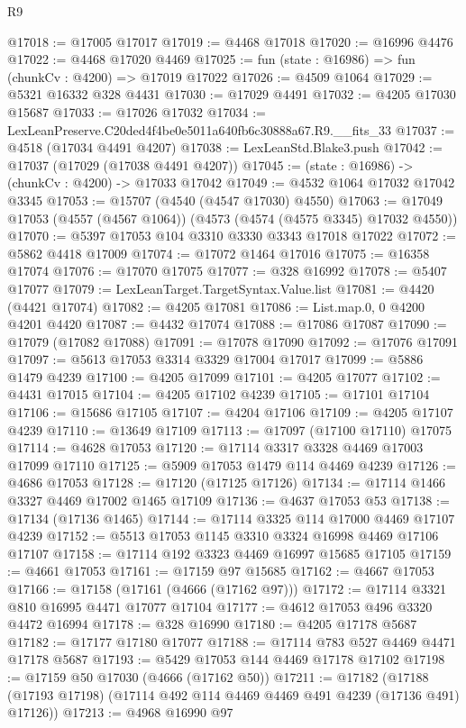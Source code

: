 \begin{lexlean}{R9}
\begin{coremodule}
@17018 := @17005 @17017
@17019 := @4468 @17018
@17020 := @16996 @4476
@17022 := @4468 @17020 @4469
@17025 := fun (state : @16986) => fun (chunkCv : @4200) => @17019 @17022
@17026 := @4509 @1064
@17029 := @5321 @16332 @328 @4431
@17030 := @17029 @4491
@17032 := @4205 @17030 @15687
@17033 := @17026 @17032
@17034 := LexLeanPreserve.C20ded4f4be0e5011a640fb6c30888a67.R9.__fits_33
@17037 := @4518 (@17034 @4491 @4207)
@17038 := LexLeanStd.Blake3.push
@17042 := @17037 (@17029 (@17038 @4491 @4207))
@17045 := (state : @16986) -> (chunkCv : @4200) -> @17033 @17042
@17049 := @4532 @1064 @17032 @17042 @3345
@17053 := @15707 (@4540 (@4547 @17030) @4550)
@17063 := @17049 @17053 (@4557 (@4567 @1064)) (@4573 (@4574 (@4575 @3345) @17032 @4550))
@17070 := @5397 @17053 @104 @3310 @3330 @3343 @17018 @17022
@17072 := @5862 @4418 @17009
@17074 := @17072 @1464 @17016
@17075 := @16358 @17074
@17076 := @17070 @17075
@17077 := @328 @16992
@17078 := @5407 @17077
@17079 := LexLeanTarget.TargetSyntax.Value.list
@17081 := @4420 (@4421 @17074)
@17082 := @4205 @17081
@17086 := List.map.{0, 0} @4200 @4201 @4420
@17087 := @4432 @17074
@17088 := @17086 @17087
@17090 := @17079 (@17082 @17088)
@17091 := @17078 @17090
@17092 := @17076 @17091
@17097 := @5613 @17053 @3314 @3329 @17004 @17017
@17099 := @5886 @1479 @4239
@17100 := @4205 @17099
@17101 := @4205 @17077
@17102 := @4431 @17015
@17104 := @4205 @17102 @4239
@17105 := @17101 @17104
@17106 := @15686 @17105
@17107 := @4204 @17106
@17109 := @4205 @17107 @4239
@17110 := @13649 @17109
@17113 := @17097 (@17100 @17110) @17075
@17114 := @4628 @17053
@17120 := @17114 @3317 @3328 @4469 @17003 @17099 @17110
@17125 := @5909 @17053 @1479 @114 @4469 @4239
@17126 := @4686 @17053
@17128 := @17120 (@17125 @17126)
@17134 := @17114 @1466 @3327 @4469 @17002 @1465 @17109
@17136 := @4637 @17053 @53
@17138 := @17134 (@17136 @1465)
@17144 := @17114 @3325 @114 @17000 @4469 @17107 @4239
@17152 := @5513 @17053 @1145 @3310 @3324 @16998 @4469 @17106 @17107
@17158 := @17114 @192 @3323 @4469 @16997 @15685 @17105
@17159 := @4661 @17053
@17161 := @17159 @97 @15685
@17162 := @4667 @17053
@17166 := @17158 (@17161 (@4666 (@17162 @97)))
@17172 := @17114 @3321 @810 @16995 @4471 @17077 @17104
@17177 := @4612 @17053 @496 @3320 @4472 @16994
@17178 := @328 @16990
@17180 := @4205 @17178 @5687
@17182 := @17177 @17180 @17077
@17188 := @17114 @783 @527 @4469 @4471 @17178 @5687
@17193 := @5429 @17053 @144 @4469 @17178 @17102
@17198 := @17159 @50 @17030 (@4666 (@17162 @50))
@17211 := @17182
    (@17188 (@17193 @17198) (@17114 @492 @114 @4469 @4469 @491 @4239 (@17136 @491) @17126))
@17213 := @4968 @16990 @97

\end{coremodule}
\end{lexlean}
